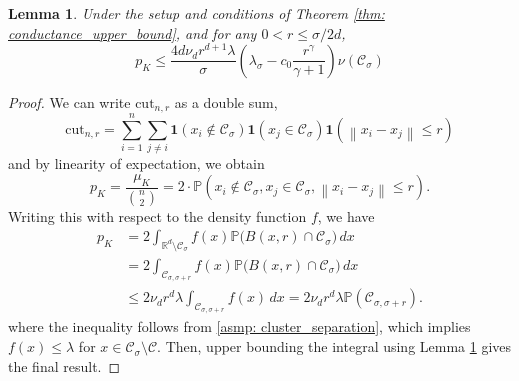 \documentclass{article}
\newcommand{\cut}{\mathrm{cut}}
\newcommand{\Reals}{\mathbb{R}}
\newcommand{\Rd}{\Reals^d}
\newcommand{\norm}[1]{\left\lVert#1\right\rVert}
\newcommand{\1}{\mathbf{1}}
\newcommand{\Pbb}{\mathbb{P}}
\newcommand{\Cset}{\mathcal{C}}
\newcommand{\Csig}{\Cset_{\sigma}}
\newcommand{\Csigr}{\Cset_{\sigma,\sigma + r}}
\newcommand{\dx}{\,dx}
\theoremstyle{aldenthm}
\newtheorem{lemma}{Lemma}
\theoremstyle{aldenrmrk}
\begin{document}
\begin{lemma}
	\label{lem: expected_density_cut}
	Under the setup and conditions of Theorem \ref{thm: conductance_upper_bound}, and for any $0 < r \leq \sigma/2d$,
	\begin{equation*}
	p_K \leq \frac{4 d \nu_d r^{d+1} \lambda}{\sigma} \left(\lambda_{\sigma} - c_0\frac{r^{\gamma}}{\gamma + 1}\right) \nu(\Csig)
	\end{equation*}
\end{lemma}
\begin{proof}
	We can write $\cut_{n,r}$ as a double sum,
	\begin{equation}
	\label{eqn: density_cut_expansion}
	\cut_{n,r} = \sum_{i = 1}^{n} \sum_{j \neq i} \1(x_i \not\in \Csig) \1(x_j \in \Csig) \1(\norm{x_i - x_j} \leq r)
	\end{equation}
	and by linearity of expectation, we obtain
	\begin{equation*}
	p_K = \frac{\mu_K}{{n \choose 2}} = 2 \cdot \Pbb(x_i \not\in \Csig, x_j \in \Csig, \norm{x_i - x_j} \leq r). \tag{for each $i,j$, $i \neq j$}
	\end{equation*}
	Writing this with respect to the density function $f$, we have
	\begin{align*}
	p_K & = 2 \int_{\Rd \setminus \Csig} f(x) \Pbb\bigl(B(x,r) \cap \Csig\bigr) \dx \\
	& = 2 \int_{\Csigr} f(x) \Pbb\bigl(B(x,r) \cap \Csig\bigr) \dx \\
	& \leq 2 \nu_d r^d \lambda  \int_{\Csigr} f(x) \dx = 2 \nu_d r^d \lambda \Pbb(\Csigr).
	\end{align*}
	where the inequality follows from \ref{asmp: cluster_separation}, which implies $f(x) \leq \lambda$ for $x \in \Csig \setminus \Cset$. Then, upper bounding the integral using Lemma \ref{lem: expected_density_cut} gives the final result.
\end{proof}
\end{document}
